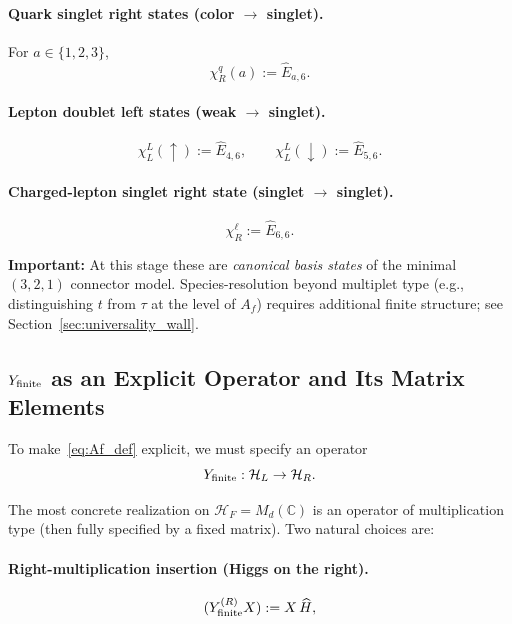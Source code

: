 \paragraph{Quark singlet right states (color $\to$ singlet).}
For $a \in \{1,2,3\}$,
\begin{equation}
\chi^{q}_{R}(a) := \widehat{E}_{a,6}.
\end{equation}

\paragraph{Lepton doublet left states (weak $\to$ singlet).}
\begin{equation}
\chi^{L}_{L}(\uparrow) := \widehat{E}_{4,6}, \qquad
\chi^{L}_{L}(\downarrow) := \widehat{E}_{5,6}.
\end{equation}

\paragraph{Charged-lepton singlet right state (singlet $\to$ singlet).}
\begin{equation}
\chi^{\ell}_{R} := \widehat{E}_{6,6}.
\end{equation}

\noindent
\textbf{Important:} At this stage these are \emph{canonical basis states} of the minimal $(3,2,1)$ 
connector model. Species-resolution beyond multiplet type (e.g., distinguishing $t$ from $\tau$ 
at the level of $A_f$) requires additional finite structure; see Section~\ref{sec:universality_wall}.

\subsection{$Y_{\rm finite}$ as an Explicit Operator and Its Matrix Elements}

To make~\eqref{eq:Af_def} explicit, we must specify an operator
\begin{equation}
Y_{\rm finite}: \mathcal{H}_L \to \mathcal{H}_R.
\end{equation}

The most concrete realization on $\mathcal{H}_F = M_d(\mathbb{C})$ is an operator of multiplication 
type (then fully specified by a fixed matrix). Two natural choices are:

\paragraph{Right-multiplication insertion (Higgs on the right).}
\begin{equation}
(Y^{(R)}_{\rm finite} X) := X\,\widehat{H},
\label{eq:Yright}
\end{equation}

